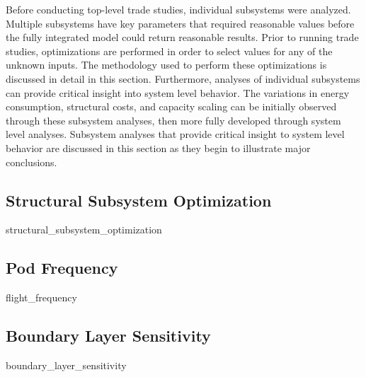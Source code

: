 Before conducting top-level trade studies, individual subsystems were
analyzed. Multiple subsystems have key parameters that required reasonable
values before the fully integrated model could return reasonable results.
Prior to running trade studies, optimizations are performed in order to select
values for any of the unknown inputs. The methodology used to perform these
optimizations is discussed in detail in this section. Furthermore, analyses of
individual subsystems can provide critical insight into system level behavior.
The variations in energy consumption, structural costs, and capacity scaling
can be initially observed through these subsystem analyses, then more fully
developed through system level analyses. Subsystem analyses that provide
critical insight to system level behavior are discussed in this section as
they begin to illustrate major conclusions.
\subsection{Structural Subsystem Optimization}
	{structural_subsystem_optimization}
\subsection{Pod Frequency}
	{flight_frequency}
\subsection{Boundary Layer Sensitivity}
	{boundary_layer_sensitivity}
